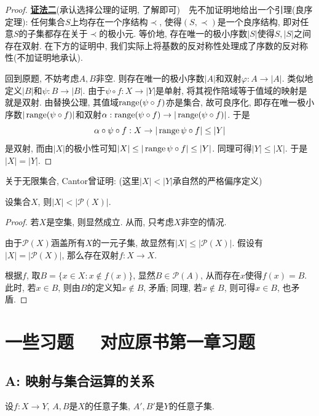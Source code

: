 \begin{proof}
	\underline{\textbf{证法二}}(承认选择公理的证明, 了解即可)~~先不加证明地给出一个引理(良序定理): 任何集合$S$上均存在一个序结构$\prec$, 使得$(S,\prec)$是一个良序结构, 即对任意$S$的子集都存在关于$\prec$的极小元. 等价地, 存在唯一的极小序数$|S|$使得$S,|S|$之间存在双射. 在下方的证明中, 我们实际上将基数的反对称性处理成了序数的反对称性(不加证明地承认). 
	
	回到原题, 不妨考虑$A,B$非空. 则存在唯一的极小序数$|A|$和双射$\varphi :A \to |A|$. 类似地定义$|B|$和$\psi :B \to |B|$. 由于$\psi \circ f:X \to |Y|$是单射, 将其视作陪域等于值域的映射是就是双射. 由替换公理, 其值域$\operatorname{range} (\psi \circ f)$亦是集合, 故可良序化, 即存在唯一极小序数$|\operatorname{range} (\psi \circ f)|$和双射$\alpha :\operatorname{range} (\psi \circ f) \to |\operatorname{range} (\psi \circ f)|$. 于是$$\alpha \circ \psi \circ f:X \to |\operatorname{range} \psi \circ f| \leq |Y|$$
	是双射, 而由$|X|$的极小性可知$|X| \leq |\operatorname{range} \psi \circ f| \leq |Y|$. 同理可得$|Y| \leq |X|$. 于是$|X|=|Y|$. 
\end{proof}



关于无限集合, Cantor曾证明: (这里$|X|<|Y|$承自然的严格偏序定义)

\begin{theorem}{}
	设集合$X$, 则$|X|< |\mathcal{P}(X)|$.
\end{theorem}
\begin{proof}
	若$X$是空集, 则显然成立. 从而, 只考虑$X$非空的情况. 
	
	由于$\mathcal{P}(X)$涵盖所有$X$的一元子集, 故显然有$|X| \leq |\mathcal{P}(X)|$. 假设有$|X| = | \mathcal{P}(X)|$, 那么存在双射$f: X \to X$. 
	
	根据$f$, 取$B=\{ x \in X: x \notin f(x) \}$, 显然$B \in \mathcal{P}(A)$, 从而存在$x$使得$f(x)=B$. 此时, 若$x \in B$, 则由$B$的定义知$x \notin B$, 矛盾; 同理, 若$x \notin B$, 则可得$x \in B$, 也矛盾. 
\end{proof}


\newpage
\section*{一些习题 ~~\small 对应原书第一章习题} \label{sec:ex1.1}

\subsection*{A: 映射与集合运算的关系}

设$f:X \to Y$, $A,B$是$X$的任意子集, $A',B'$是$Y$的任意子集. 
\vspace{1em}

